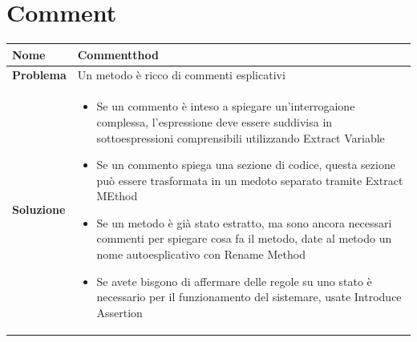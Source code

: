 \section{Comment}
\begin{table}[h]
    \centering
    \renewcommand{\arraystretch}{1.2} %
    \begin{tabularx}{\textwidth}{l X}
        \toprule
        \textbf{Nome} & Commentthod \\
        \midrule
        \textbf{Problema} & Un metodo è ricco di commenti esplicativi\\
        \midrule
        \textbf{Soluzione} & 
        \begin{itemize}[leftmargin=*, nosep, after=\vspace{0.5em}]
            \item Se un commento è inteso a spiegare un'interrogaione complessa, l'espressione deve essere suddivisa in sottoespressioni comprensibili utilizzando Extract Variable
            \item Se un commento spiega una sezione di codice, questa sezione può essere trasformata in un medoto separato tramite Extract MEthod
            \item Se un metodo è già stato estratto, ma sono ancora necessari commenti per spiegare cosa fa il metodo, date al metodo un nome autoesplicativo con Rename Method
            \item Se avete bisgono di affermare delle regole su uno stato è necessario per il funzionamento del sistemare, usate Introduce Assertion
        \end{itemize}
        \\ %
        \bottomrule
    \end{tabularx}
\end{table}

\newpage

